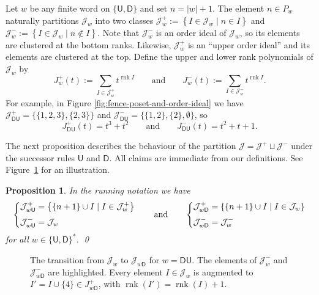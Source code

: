 \documentclass{amsart}
\def\cJ{\mathcal J}
\newcommand{\Top}[1]{#1^{+}}
\newcommand{\Bot}[1]{#1^{-}}
\newcommand{\Jtop}[1]{J_{#1}^+}
\newcommand{\Jbot}[1]{J_{#1}^-}
\def\rnk{\operatorname{rnk}}
\def\qand{\quad\hbox{and}\quad}
\def\pU{\mathsf U}
\def\pD{\mathsf D}
\newtheorem{proposition}[theorem]{Proposition}
\theoremstyle{definition}
\begin{document}
Let $w$ be any finite word on $\{\pU,\pD\}$ and set $n=|w|+1$. The element $n \in P_w$ naturally partitions $\cJ_w$ into  two classes  $\Top{\cJ_w} := \left\{I \in \cJ_w \mid {n}\in I\right\}$ and $\Bot{\cJ_w} := \left\{I \in \cJ_w \mid {n}\not\in I\right\}$. Note that  $\Bot{\cJ_w}$ is an order ideal of $\cJ_w$, so its elements are clustered at the bottom ranks. Likewise, $\Top{\cJ_w}$ is an ``upper order ideal'' and its elements are clustered at the top. 
Define the upper and lower rank polynomials of $\cJ_w$ by
$$
\Jtop{w}(t) := \sum_{I \in \Top{\cJ_w}} t^{\rnk{I}}
\qquad\text{and}\qquad
\Jbot{w}(t) := \sum_{I \in \Bot{\cJ_w}} t^{\rnk{I}}.
$$
For example, in
Figure \ref{fig:fence-poset-and-order-ideal} we have $\Top{\cJ_{\pD\pU}} = \{\{1,2,3\},\{2,3\}\}$ and $\Bot{\cJ_{\pD\pU}} = \{\{1,2\}, \{2\},\emptyset\}$, so
\begin{equation}
\label{eq:runningex2}
\Jtop{\pD\pU}(t)=t^3+t^2
\qquad\text{and}\qquad
\Jbot{\pD\pU}(t)=t^2+t+1. 
\end{equation}

The next proposition describes the behaviour of the partition $\cJ = \Top{\cJ} \sqcup \Bot{\cJ}$ under the successor rules $\pU$ and $\pD$.
All claims are immediate from our definitions. See Figure~\ref{fig:fence-poset-move} for an illustration.

\begin{proposition}
\label{th:order-ideals}
In the running notation we have
\begin{gather*}
    \left\{
    \begin{aligned}
        \Top{\cJ_{w\pU}} &= \left\{\{n+1\}\cup I \mid I \in \Top{\cJ_w}\right\} \\[.5ex]
        \Bot{\cJ_{w\pU}} &= \cJ_w
    \end{aligned}
    \right.
%
\quad\qand\quad
%
    \left\{
    \begin{aligned}
        \Top{\cJ_{w\pD}} &= \left\{\{n+1\}\cup I \mid I \in \cJ_w\right\} \\[.5ex]
        \Bot{\cJ_{w\pD}} &= \Bot{\cJ_w}
    \end{aligned}
    \right.
\end{gather*}
for all $w \in \{\pU,\pD\}^*$.
\qed
\end{proposition}
\begin{figure}[!hbt]
\centering


\caption{The transition from $\cJ_{w}$ to $\cJ_{w\pD}$ for $w=\pD\pU$.  The elements of $\Bot{\cJ_{w}}$ and $\Bot{\cJ_{w\pD}}$ are highlighted. Every element $I \in \cJ_w$ is augmented to $I' = I \cup \{4\} \in \Jtop{w\pD}$, with $\rnk(I')=\rnk(I)+1$.}
\label{fig:fence-poset-move}
\end{figure}
\end{document}
